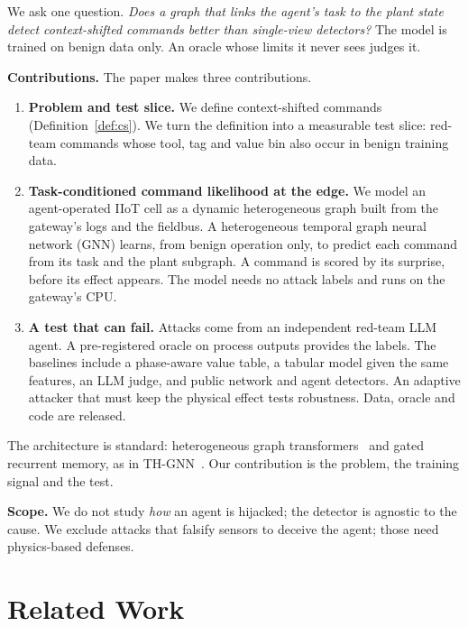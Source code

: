 \documentclass[journal]{IEEEtran}
\begin{document}
We ask one question. \emph{Does a graph that links the agent's task to the plant state detect context-shifted commands better than single-view detectors?} The model is trained on benign data only. An oracle whose limits it never sees judges it.

\textbf{Contributions.} The paper makes three contributions.
\begin{enumerate}
\item \textbf{Problem and test slice.} We define context-shifted commands (Definition~\ref{def:cs}). We turn the definition into a measurable test slice: red-team commands whose tool, tag and value bin also occur in benign training data.
\item \textbf{Task-conditioned command likelihood at the edge.} We model an agent-operated IIoT cell as a dynamic heterogeneous graph built from the gateway's logs and the fieldbus. A heterogeneous temporal graph neural network (GNN) learns, from benign operation only, to predict each command from its task and the plant subgraph. A command is scored by its surprise, before its effect appears. The model needs no attack labels and runs on the gateway's CPU.
\item \textbf{A test that can fail.} Attacks come from an independent red-team LLM agent. A pre-registered oracle on process outputs provides the labels. The baselines include a phase-aware value table, a tabular model given the same features, an LLM judge, and public network and agent detectors. An adaptive attacker that must keep the physical effect tests robustness. Data, oracle and code are released.
\end{enumerate}

The architecture is standard: heterogeneous graph transformers~\cite{hu2020hgt} and gated recurrent memory, as in TH-GNN~\cite{swarup2026thgnn}. Our contribution is the problem, the training signal and the test.

\textbf{Scope.} We do not study \emph{how} an agent is hijacked; the detector is agnostic to the cause. We exclude attacks that falsify sensors to deceive the agent; those need physics-based defenses.

\section{Related Work}\label{sec:related}
\end{document}
